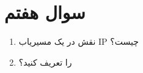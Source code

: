 \section{سوال هفتم}

\begin{enumerate}
	\item 
	نقش  در یک مسیریاب IP چیست؟
	
	\begin{qsolve}
		
	\end{qsolve}
	
	
	
	
	\item 
	  را تعریف کنید؟

	\begin{qsolve}
		
	\end{qsolve}


\end{enumerate}
